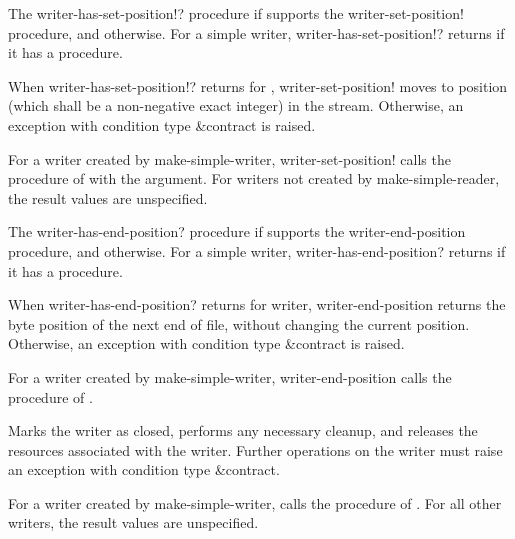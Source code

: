 \begin{entry}{%
}


The {\cf writer-has-set-position!?} procedure \schtrue{} if 
supports the {\cf writer-set-position!} procedure, and \schfalse{}
otherwise.  For a simple writer, {\cf writer-has-set-position!?}
returns \schtrue{} if it has a  procedure.

When {\cf writer-has-set-position!?} returns \schtrue{} for
, {\cf writer-set-position!}
moves to position  (which shall be a non-negative
exact integer) in the stream.
Otherwise, an exception with condition type
{\cf\&contract} is raised.  

For a writer created by {\cf make-simple-writer}, {\cf
  writer-set-position!} calls the   procedure of
 with the  argument.  For writers not created by
{\cf make-simple-reader}, the result values are unspecified.
\end{entry}

\begin{entry}{%
}

The {\cf writer-has-end-position?} procedure \schtrue{} if 
supports the {\cf writer-end-position} procedure, and \schfalse{}
otherwise.  For a simple writer, {\cf writer-has-end-position?}
returns \schtrue{} if it has a  procedure.
  
When {\cf writer-has-end-position?} returns \schtrue{} for writer,
{\cf writer-end-position}
returns the byte position of the next end of file, without
changing the current position.  Otherwise, an exception with condition
type {\cf\&contract} is raised.
   
For a writer created by {\cf make-simple-writer}, {\cf
  writer-end-position} calls the  procedure of
.
\end{entry}

\begin{entry}{%
}
   
Marks the writer as closed, performs any necessary cleanup, and
releases the resources associated with the writer. Further operations
on the writer must raise an exception with condition type
{\cf\&contract}.
   
For a writer created by {\cf make-simple-writer}, calls the
 procedure of .  For all other writers,
the result values are unspecified.
\end{entry}

